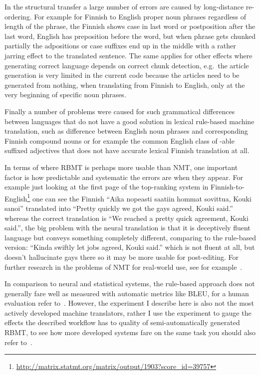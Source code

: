 \documentclass[free]{flammie}
\begin{document}
In the structural transfer a large number of errors are caused by long-distance
re-ordering. For example for Finnish to English proper noun phrases regardless
of length of the phrase, the Finnish shows case in last word or postposition
after the last word, English has preposition before the word, but when phrase
gets chunked partially the adpositions or case suffixes end up in the middle
with a rather jarring effect to the translated sentence. The same applies for
other effects where generating correct language depends on correct chunk
detection, e.g.\ the article generation is very limited in the current code
because the articles need to be generated from nothing, when translating from
Finnish to English, only at the very beginning of specific noun phrases.

Finally a number of problems were caused for such grammatical differences
between languages that do not have a good solution in lexical rule-based machine
translation, such as difference between English noun phrases and corresponding
Finnish compound nouns or for example the common English class of -able suffixed
adjectives that does not have accurate lexical Finnish translation at all.

In terms of where RBMT is perhaps more usable than NMT, one important factor is
how predictable and systematic the errors are when they appear. For example just
looking at the first page of the top-ranking system in
Finnish-to-English\footnote{\url{http://matrix.statmt.org/matrix/output/1903?score_id=39757}} one can
see the Finnish ``Aika nopeasti saatiin hommat sovittua, Kouki sanoi'' translated into
``Pretty quickly we got the gays agreed, Kouki said.'' whereas the correct translation
is ``We reached a pretty quick agreement, Kouki said.'', the big  problem with the neural
translation is that it is deceptively fluent language but conveys something completely
different, comparing to the rule-based version: ``Kinda swiftly let jobs agreed, Kouki said.'' which
is not fluent at all, but doesn't hallucinate gays there so it may be more usable for
post-editing. For further research in the problems of NMT for real-world use, see for
example~\cite{moorkens2018translators}.

In comparison to neural and statistical systems, the rule-based approach does not
generally fare well as measured with automatic metrics like BLEU, for a human
evaluation refer to~\cite{bojar-EtAl:2019:WMT2}. However, the experiment I describe here is also
not the most actively developed machine translators, rather I use the experiment
to gauge the effects the described workflow has to quality of semi-automatically
generated RBMT, to see how more developed systems fare on the same task you
should also refer to~\cite{hurskainen2017rule,kolachina2015gf}.
\end{document}
